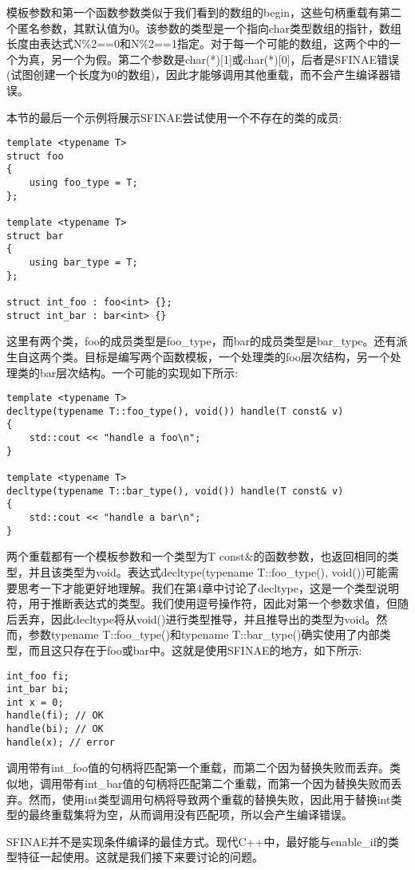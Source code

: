 模板参数和第一个函数参数类似于我们看到的数组的begin，这些句柄重载有第二个匿名参数，其默认值为0。该参数的类型是一个指向char类型数组的指针，数组长度由表达式N\%2==0和N\%2==1指定。对于每一个可能的数组，这两个中的一个为真，另一个为假。第二个参数是char(*)[1]或char(*)[0]，后者是SFINAE错误(试图创建一个长度为0的数组)，因此才能够调用其他重载，而不会产生编译器错误。

本节的最后一个示例将展示SFINAE尝试使用一个不存在的类的成员:

\begin{lstlisting}[style=styleCXX]
template <typename T>
struct foo
{
	using foo_type = T;
};

template <typename T>
struct bar
{
	using bar_type = T;
};

struct int_foo : foo<int> {};
struct int_bar : bar<int> {}
\end{lstlisting}

这里有两个类，foo的成员类型是foo\_type，而bar的成员类型是bar\_type。还有派生自这两个类。目标是编写两个函数模板，一个处理类的foo层次结构，另一个处理类的bar层次结构。一个可能的实现如下所示:

\begin{lstlisting}[style=styleCXX]
template <typename T>
decltype(typename T::foo_type(), void()) handle(T const& v)
{
	std::cout << "handle a foo\n";
}

template <typename T>
decltype(typename T::bar_type(), void()) handle(T const& v)
{
	std::cout << "handle a bar\n";
}
\end{lstlisting}

两个重载都有一个模板参数和一个类型为T const\&的函数参数，也返回相同的类型，并且该类型为void。表达式decltype(typename T::foo\_type(), void())可能需要思考一下才能更好地理解。我们在第4章中讨论了decltype，这是一个类型说明符，用于推断表达式的类型。我们使用逗号操作符，因此对第一个参数求值，但随后丢弃，因此decltype将从void()进行类型推导，并且推导出的类型为void。然而，参数typename T::foo\_type()和typename T::bar\_type()确实使用了内部类型，而且这只存在于foo或bar中。这就是使用SFINAE的地方，如下所示:

\begin{lstlisting}[style=styleCXX]
int_foo fi;
int_bar bi;
int x = 0;
handle(fi); // OK
handle(bi); // OK
handle(x); // error
\end{lstlisting}

调用带有int\_foo值的句柄将匹配第一个重载，而第二个因为替换失败而丢弃。类似地，调用带有int\_bar值的句柄将匹配第二个重载，而第一个因为替换失败而丢弃。然而，使用int类型调用句柄将导致两个重载的替换失败，因此用于替换int类型的最终重载集将为空，从而调用没有匹配项，所以会产生编译错误。

SFINAE并不是实现条件编译的最佳方式。现代C++中，最好能与enable\_if的类型特征一起使用。这就是我们接下来要讨论的问题。






















